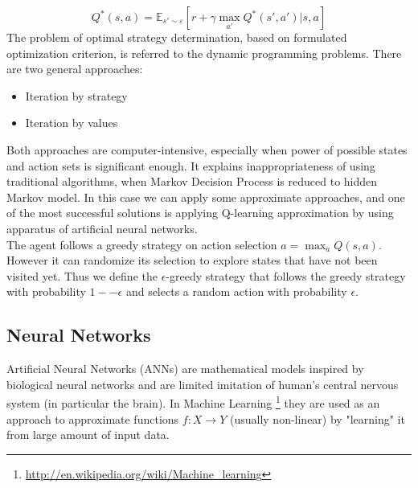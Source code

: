 \documentclass[a4paper,oneside,dvipsnames]{article}
\begin{document}
\begin{equation} \label{eq:quality}
    Q^*(s,a) = \mathbb{E}_{s'\sim \varepsilon}[r + \gamma \max_{a'} Q^*(s', a')|s,a]
\end{equation}
The problem of optimal strategy determination, based on formulated optimization criterion, is referred to the dynamic programming problems. There are two general approaches:
\begin{itemize}
    \item Iteration by strategy
    \item Iteration by values
\end{itemize}
Both approaches are computer-intensive, especially when power of possible states and action sets is significant enough. It explains inappropriateness of using traditional algorithms, when Markov Decision Process is reduced to hidden Markov model. In this case we can apply some approximate approaches, and one of the most successful solutions is applying Q-learning approximation by using apparatus of artificial neural networks.\\
The agent follows a greedy strategy on action selection $a = \max_{a} Q(s, a)$.  However it can randomize its selection to explore states that have not been visited yet. Thus we define the $\epsilon$-greedy strategy that follows the greedy strategy with probability $1 -− \epsilon$ and selects a random action with probability $\epsilon$.

\subsection[Neural Networks]{Neural Networks}
Artificial Neural Networks (ANNs) are mathematical models inspired by biological neural networks and are limited imitation of human's central nervous system (in particular the brain). In Machine Learning
\footnote{\url{http://en.wikipedia.org/wiki/Machine\_learning}}
they are used as an approach to approximate functions $f : X \to Y$ (usually non-linear) by "learning" it from large amount of input data.
\end{document}
